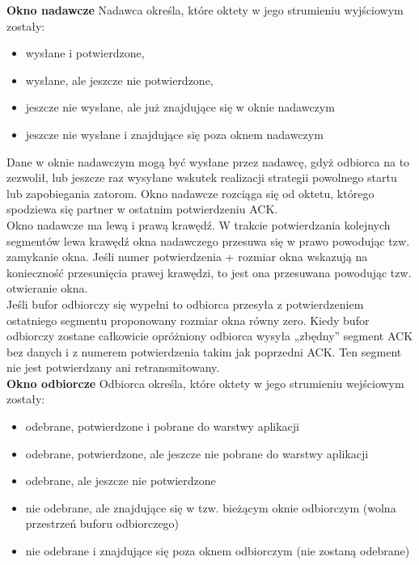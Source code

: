 \documentclass[a4paper]{article}
\begin{document}
\textbf{Okno nadawcze}
Nadawca określa, które oktety w jego strumieniu wyjściowym zostały:
\begin{itemize}
    \item wysłane i potwierdzone,
    \item wysłane, ale jeszcze nie potwierdzone,
    \item jeszcze nie wysłane, ale już znajdujące się w oknie nadawczym
    \item jeszcze nie wysłane i znajdujące się poza oknem nadawczym
\end{itemize}
Dane w oknie nadawczym mogą być wysłane przez nadawcę, gdyż odbiorca na to zezwolił, lub jeszcze raz wysyłane wskutek realizacji strategii powolnego startu lub zapobiegania zatorom.
Okno nadawcze rozciąga się od oktetu, którego spodziewa się partner w ostatnim
potwierdzeniu ACK.\\
Okno nadawcze ma lewą i prawą krawędź. W trakcie potwierdzania kolejnych segmentów
lewa krawędź okna nadawczego przesuwa się w prawo powodując tzw. zamykanie okna. Jeśli
numer potwierdzenia + rozmiar okna wskazują na konieczność przesunięcia prawej krawędzi,
to jest ona przesuwana powodując tzw. otwieranie okna.\\
Jeśli bufor odbiorczy się wypełni to odbiorca przesyła z
potwierdzeniem ostatniego segmentu proponowany rozmiar okna równy zero.
Kiedy bufor odbiorczy zostane całkowicie opróżniony odbiorca wysyła
„zbędny” segment ACK bez danych i z numerem potwierdzenia takim jak poprzedni ACK. Ten
segment nie jest potwierdzany ani retransmitowany.\\

\textbf{Okno odbiorcze}
Odbiorca określa, które oktety w jego strumieniu wejściowym zostały:
\begin{itemize}
    \item odebrane, potwierdzone i pobrane do warstwy aplikacji
    \item odebrane, potwierdzone, ale jeszcze nie pobrane do warstwy aplikacji
    \item odebrane, ale jeszcze nie potwierdzone
    \item nie odebrane, ale znajdujące się w tzw. bieżącym oknie odbiorczym (wolna przestrzeń buforu odbiorczego)
    \item nie odebrane i znajdujące się poza oknem odbiorczym (nie zostaną odebrane)
\end{itemize}
\end{document}
